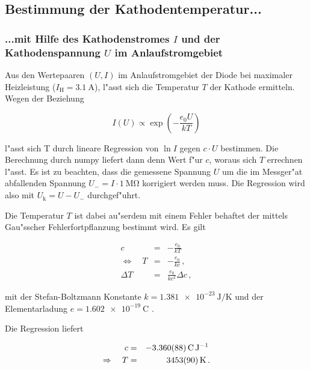 		\enlargethispage{10cm}

		\clearpage

	\subsection{Bestimmung der Kathodentemperatur...}
		\subsubsection{...mit Hilfe des Kathodenstromes $I$ und der Kathodenspannung $U$ im Anlaufstromgebiet}
			\label{subsubsec:temp1}
			Aus den Wertepaaren $(U,I)$ im Anlaufstromgebiet der Diode bei maximaler Heizleistung ($I_\mathrm{H} = \SI{3.1}{\ampere}$), l"asst sich die Temperatur $T$ der Kathode ermitteln.
			Wegen der Beziehung

			\begin{equation*}
				I(U) \propto \exp{\left(-\frac{e_0 U}{kT}\right)}
			\end{equation*}

			l"asst sich T durch lineare Regression von $\ln{I}$ gegen $c\cdot U$ bestimmen. Die Berechnung durch numpy liefert dann denn Wert f"ur $c$, woraus sich $T$ errechnen l"asst.
			Es ist zu beachten, dass die gemessene Spannung $U$ um die im Messger"at abfallenden Spannung $U_- = I \cdot \SI{1}{\mega \ohm}$ korrigiert werden muss.
			Die Regression wird also mit $U_\mathrm{k} = U - U_-$ durchgef"uhrt.

			Die Temperatur $T$ ist dabei au"serdem mit einem Fehler behaftet der mittels Gau"sscher Fehlerfortpflanzung bestimmt wird.
			Es gilt

			\begin{eqnarray*}
				c & = & -\frac{e_0}{kT}\,\\
				\Leftrightarrow \quad T & = & -\frac{e_0}{kc}\,,\\
				\Delta T & = & \frac{e_0}{kc^2}\Delta c\,,
			\end{eqnarray*}

			mit der Stefan-Boltzmann Konstante $k = \SI{1.381e-23}{\joule \per \kelvin}$ \cite{nist} und der Elementarladung $e = \SI{1.602e-19}{\coulomb}$ \cite{nist}.

			Die Regression liefert

			\begin{eqnarray*}
				c & = & \SI{-3.360 (88)}{\coulomb \per \joule}\,\\
				\Rightarrow \quad T & = & \SI{3453 (90)}{\kelvin}\,.
			\end{eqnarray*}


